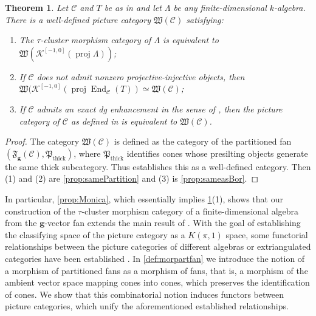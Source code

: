 \documentclass[10pt,twoside, a4paper,reqno]{amsart}
\DeclareMathOperator{\End}{End}
\DeclareMathOperator{\thick}{thick}
\DeclareMathOperator{\proj}{proj}
\newcommand{\Ktwo}{\mathcal{K}^{[-1,0]}}
\newcommand{\partfan}[1]{\mathfrak{F}_{\bfg}(#1)}
\newcommand{\Wfrak}{\mathfrak{W}}
\newcommand{\Pfrak}{\mathfrak{P}}
\newcommand{\calC}{\mathcal{C}}
\newcommand{\bfg}{\mathbf{g}}
\newtheorem{theorem}{Theorem}[section]
\theoremstyle{definition}
\begin{document}
\begin{theorem}\label{thm:introthm1}
    Let $\calC$ {and $T$} be as in  and let $\Lambda$ be any finite-dimensional $k$-algebra. There is a well-defined picture category $\Wfrak(\calC)$ satisfying:
    \begin{enumerate}
        \item The $\tau$-cluster morphism category of $\Lambda$ is equivalent to $\Wfrak(\Ktwo(\proj \Lambda))$;
        \item If $\calC$ does not admit nonzero projective-injective objects, then $\Wfrak(\Ktwo(\proj \End_{\calC}(T)) \simeq \Wfrak(\calC)$;
        \item If $\calC$ admits an exact dg enhancement in the sense of \cite{Che23}, then the picture category of $\calC$ as defined in \cite{Bor24} is equivalent to $\Wfrak(\calC)$. 
    \end{enumerate}
\end{theorem}
\begin{proof}
    The category $\Wfrak(\calC)$ is defined as the category of the partitioned fan $(\partfan{\calC}, \Pfrak_{\thick})$, where $\Pfrak_{\thick}$ identifies cones whose presilting objects generate the same thick subcategory. Thus \cite[{Prop.} 3.8]{Kai23} establishes this as a well-defined category. Then (1) and (2) are \cref{prop:samePartition} and (3) is \cref{prop:sameasBor}.
\end{proof}

In particular, \cref{prop:Monica}, which essentially implies \cref{thm:introthm1}(1), shows that our construction of the $\tau$-cluster morphism category of a finite-dimensional algebra from the $\bfg$-vector fan extends the main result of \cite{STTW23}. With the goal of establishing the classifying space of the picture category as a $K(\pi,1)$ space, some functorial relationships between the picture categories of different algebras or extriangulated categories have been established \cite{BH21,Bor24,BorveKaipeltautilt,Kai24}. In \cref{def:morpartfan} we introduce the notion of a morphism of partitioned fans as a morphism of fans, that is, a morphism of the ambient vector space mapping cones into cones, which preserves the identification of cones. We show that this combinatorial notion induces functors between picture categories, which unify the aforementioned established relationships.
\end{document}
